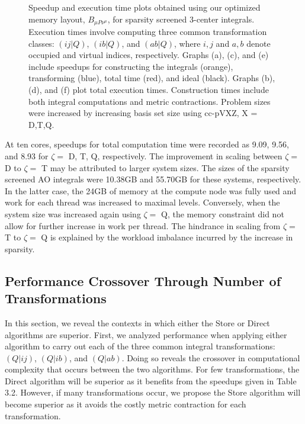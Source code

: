 \begin{figure}[H]
  \hfill
  \hfill
  \caption{Speedup and execution time plots obtained using our optimized memory layout, $B_{\mu P \nu^\mu}$, 
 for sparsity screened 3-center integrals. 
 Execution times involve computing three common transformation classes: $(ij|Q)$, $(ib|Q)$, and $(ab|Q)$,
 where $i,j$ and $a,b$ denote occupied and virtual indices, respectively. Graphs (a), (c), and (e) include speedups for constructing the integrals (orange),
 transforming (blue), total time (red), and ideal (black). Graphs (b), (d), and (f) plot total execution times. Construction times include both integral computations
 and metric contractions. Problem sizes were increased by increasing basis set size
 using cc-pVXZ, X = D,T,Q.}
\end{figure}

At ten cores, speedups for total computation time were recorded as 9.09, 9.56, and 8.93 for $\zeta = $ D, T, Q, 
respectively. The improvement in scaling between $\zeta = $ D to $\zeta = $ T
may be attributed to larger system sizes. The sizes of the sparsity screened AO integrals were 10.38GB and 55.70GB 
for these systems, respectively. In the latter case,
the 24GB of memory at the compute node was fully used and work for each thread was increased to maximal levels. Conversely, 
when the system size was increased again using
$\zeta = $ Q, the memory constraint did not allow for further increase in work per thread. 
The hindrance in scaling from $\zeta = $ T to $\zeta = $ Q is explained by the workload imbalance incurred by
the increase in sparsity. 


\subsection{Performance Crossover Through Number of Transformations}

In this section, we reveal the contexts in which either the Store or Direct algorithms are superior. First, we analyzed performance when applying either algorithm
 to carry out each of the three common integral transformations: $(Q|ij)$, $(Q|ib)$, and $(Q|ab)$. Doing so reveals the crossover in computational complexity that occurs between the two
 algorithms. For few transformations, the Direct algorithm will be superior as it benefits from the speedups given
 in Table 3.2. However, if many transformations occur, we propose the Store algorithm will become superior as it avoids the costly metric contraction for each transformation.
 
